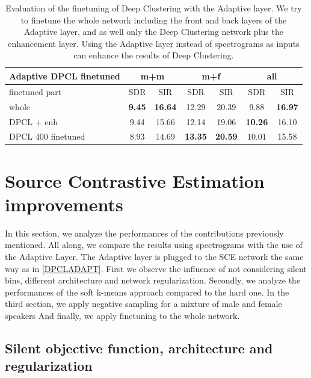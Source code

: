 \documentclass[master, tikz, final,11pt, dvipdfmx]{iscs-thesis}
\begin{document}
\begin{table}[h]
\centering
\begin{tabular}{l|c|c|c|c|c|c}
Adaptive DPCL finetuned & \multicolumn{2}{c|}{m+m} & \multicolumn{2}{c|}{m+f} & \multicolumn{2}{c}{all} \\ 
\hline 
finetuned part & SDR & SIR & SDR & SIR & SDR & SIR \\ 
\hline 
whole & \textbf{9.45} & \textbf{16.64} & 12.29 & 20.39 & 9.88 & \textbf{16.97} \\  
DPCL + enh & 9.44 & 15.66 & 12.14 & 19.06 & \textbf{10.26} & 16.10 \\ 
\hline
\hline 
DPCL 400 finetuned & 8.93 & 14.69 & \textbf{13.35} &\textbf{ 20.59} & 10.01 & 15.58 \\ 
\end{tabular}
\caption[Evaluation of the finetuning of Deep Clustering with the Adaptive layer]{Evaluation of the finetuning of Deep Clustering with the Adaptive layer. We try to finetune the whole network including the front and back layers of the Adaptive layer, and as well only the Deep Clustering network plus the enhancement layer. Using the Adaptive layer instead of spectrograms as inputs can enhance the results of Deep Clustering.}
\label{table:AdaptDPCLfine}
\end{table}

\section{Source Contrastive Estimation improvements}

In this section, we analyze the performances of the contributions previously mentioned. All along, we compare the results using spectrograms with the use of the Adaptive Layer. The Adaptive layer is plugged to the SCE network the same way as in \autoref{DPCLADAPT}.
First we observe the influence of not considering silent bins, different architecture and network regularization. Secondly, we analyze the performances of the soft k-means approach compared to the hard one. In the third section, we apply negative sampling for a mixture of male and female speakers
And finally, we apply finetuning to the whole network.

\subsection{Silent objective function, architecture and regularization}
\label{silentloss}
\end{document}
